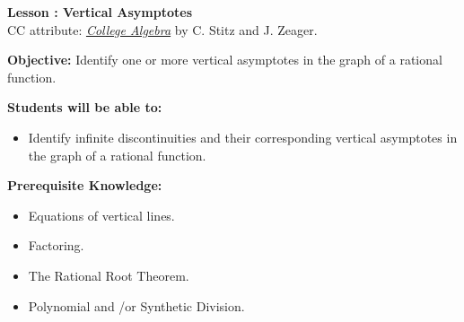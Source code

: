 \documentclass[12pt]{article}
\theoremstyle{definition}
\begin{document}
{\bf \large Lesson : Vertical Asymptotes}\label{les:vertical_asymptotes}
\\ CC attribute: \href{http://www.stitz-zeager.com}{\it{College Algebra}} by C. Stitz and J. Zeager. 
\hfill \doclicenseImage[imagewidth=5em]\\
\par
{\bf Objective:} Identify one or more vertical asymptotes in the graph of a rational function.\\
\par
{\bf Students will be able to:}
\begin{itemize}
	\item Identify infinite discontinuities and their corresponding vertical asymptotes in the graph of a rational function.
\end{itemize}
{\bf Prerequisite Knowledge:}
\begin{itemize}
  \item Equations of vertical lines.
	\item Factoring.
	\item The Rational Root Theorem.
	\item Polynomial and \slash or Synthetic Division.
\end{itemize}
\hrulefill
\end{document}
